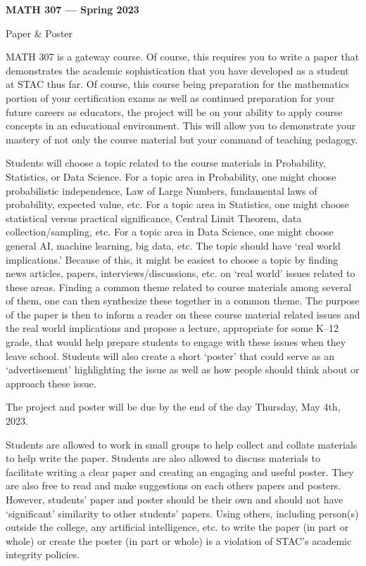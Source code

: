 \documentclass[11pt,letterpaper]{article}
\begin{document}
\begin{center} {\bfseries \Large MATH 307 --- Spring 2023 \par \vspace{0.3cm} Paper \& Poster} \end{center}

 MATH 307 is a gateway course. Of course, this requires you to write a paper that demonstrates the academic sophistication that you have developed as a student at STAC thus far. Of course, this course being preparation for the mathematics portion of your certification exams as well as continued preparation for your future careers as educators, the project will be on your ability to apply course concepts in an educational environment. This will allow you to demonstrate your mastery of not only the course material but your command of teaching pedagogy. \pspace

 Students will choose a topic related to the course materials in Probability, Statistics, or Data Science. For a topic area in Probability, one might choose probabilistic independence, Law of Large Numbers, fundamental laws of probability, expected value, etc. For a topic area in Statistics, one might choose statistical versus practical significance, Central Limit Theorem, data collection/sampling, etc. For a topic area in Data Science, one might choose general AI, machine learning, big data, etc. The topic should have `real world implications.' Because of this, it might be easiest to choose a topic by finding news articles, papers, interviews/discussions, etc. on `real world' issues related to these areas. Finding a common theme related to course materials among several of them, one can then synthesize these together in a common theme. The purpose of the paper is then to inform a reader on these course material related issues and the real world implications and propose a lecture, appropriate for some K--12 grade, that would help prepare students to engage with these issues when they leave school. Students will also create a short `poster' that could serve as an `advertisement' highlighting the issue as well as how people should think about or approach these issue. \pspace

 The project and poster will be due by the end of the day Thursday, May 4th, 2023. \pspace

 Students are allowed to work in small groups to help collect and collate materials to help write the paper. Students are also allowed to discuss materials to facilitate writing a clear paper and creating an engaging and useful poster. They are also free to read and make suggestions on each others papers and posters. However, students' paper and poster should be their own and should not have `significant' similarity to other students' papers. Using others, including person(s) outside the college, any artificial intelligence, etc. to write the paper (in part or whole) or create the poster (in part or whole) is a violation of STAC's academic integrity policies. \pspace
\end{document}
